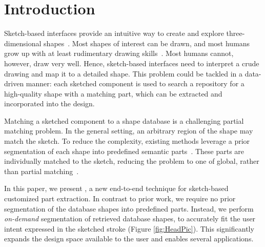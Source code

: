 \section{Introduction}

Sketch-based interfaces provide an intuitive way to create and explore three-dimensional shapes~\cite{sketchbasedmodelingsurveycg2009}. Most shapes of interest can be drawn, and most humans grow up with at least rudimentary drawing skills~\cite{DeckerChildren1988}. Most humans cannot, however, draw very well. Hence, sketch-based interfaces need to interpret a crude drawing and map it to a detailed shape. This problem could be tackled in a data-driven manner: each sketched component is used to search a repository for a high-quality shape with a matching part, which can be extracted and incorporated into the design.

Matching a sketched component to a shape database is a challenging partial matching problem. In the general setting, an arbitrary region of the shape may match the sketch. To reduce the complexity, existing methods leverage a prior segmentation of each shape into predefined semantic parts~\cite{sketchbasedcompositionfunkhousersbim2008,sketchtodesignxukaicgf2013}. These parts are individually matched to the sketch, reducing the problem to one of global, rather than partial matching~\cite{EitRicBouHilAle12}.

In this paper, we present {\ProjName}, a new end-to-end technique for sketch-based customized part extraction. In contrast to prior work, we require no prior segmentation of the database shapes into predefined parts. Instead, we perform {\em on-demand} segmentation of retrieved database shapes, to accurately fit the user intent expressed in the sketched stroke (Figure \ref{fig:HeadPic}). This significantly expands the design space available to the user and enables several applications.

